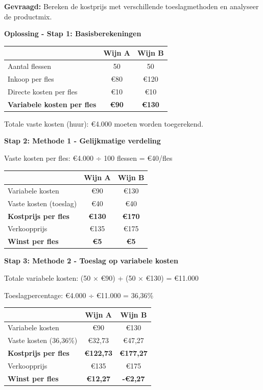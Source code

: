 \documentclass[a4paper,11pt]{article}
\begin{document}
\begin{description}
\begin{oefenblok}[title=Oefening: Wijnhandelaar - Toeslagen en Productmix]
        \textbf{Gevraagd:} Bereken de kostprijs met verschillende toeslagmethoden en analyseer de productmix.
        
        \textbf{Oplossing - Stap 1: Basisberekeningen}
        
        \begin{tabular}{lcc}
        \hline
        & \textbf{Wijn A} & \textbf{Wijn B} \\
        \hline
        Aantal flessen & 50 & 50 \\
        Inkoop per fles & €80 & €120 \\
        Directe kosten per fles & €10 & €10 \\
        \textbf{Variabele kosten per fles} & \textbf{€90} & \textbf{€130} \\
        \hline
        \end{tabular}
        
        Totale vaste kosten (huur): €4.000 moeten worden toegerekend.
        
        \textbf{Stap 2: Methode 1 - Gelijkmatige verdeling}
        
        Vaste kosten per fles: €4.000 ÷ 100 flessen = €40/fles
        
        \begin{tabular}{lcc}
        \hline
        & \textbf{Wijn A} & \textbf{Wijn B} \\
        \hline
        Variabele kosten & €90 & €130 \\
        Vaste kosten (toeslag) & €40 & €40 \\
        \textbf{Kostprijs per fles} & \textbf{€130} & \textbf{€170} \\
        Verkoopprijs & €135 & €175 \\
        \textbf{Winst per fles} & \textbf{€5} & \textbf{€5} \\
        \hline
        \end{tabular}
        
        \textbf{Stap 3: Methode 2 - Toeslag op variabele kosten}
        
        Totale variabele kosten: (50 × €90) + (50 × €130) = €11.000
        
        Toeslagpercentage: €4.000 ÷ €11.000 = 36,36\%
        
        \begin{tabular}{lcc}
        \hline
        & \textbf{Wijn A} & \textbf{Wijn B} \\
        \hline
        Variabele kosten & €90 & €130 \\
        Vaste kosten (36,36\%) & €32,73 & €47,27 \\
        \textbf{Kostprijs per fles} & \textbf{€122,73} & \textbf{€177,27} \\
        Verkoopprijs & €135 & €175 \\
        \textbf{Winst per fles} & \textbf{€12,27} & \textbf{-€2,27} \\
        \hline
        \end{tabular}
        

\end{oefenblok}
\end{description}
\end{document}
